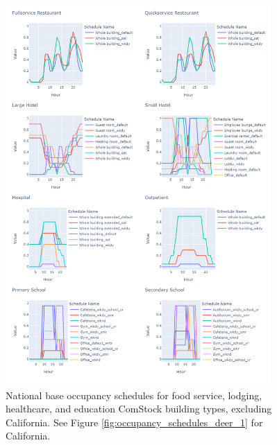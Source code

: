 \begin{figure}
    \centering \includegraphics[trim={0 0 0 0}, clip,  %
    width=0.9\textwidth]{figures/occupancy_schedules_1.png}
    \caption[National base occupancy schedules excluding California]{National base occupancy schedules for food service, lodging, healthcare, and education ComStock building types, excluding California. See Figure \ref{fig:occupancy_schedules_deer_1} for California.}
    \label{fig:occupancy_schedules_1}
\end{figure} 

